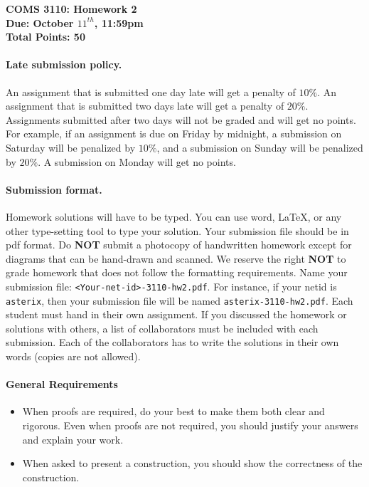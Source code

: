 \documentclass[12pt]{article}
\date{}
\begin{document}
\begin{center}
  \textbf{COMS 3110: Homework 2}\\
  \textbf{Due: October $11^{th}$, 11:59pm}\\
  \textbf{Total Points: 50}
\end{center}


\paragraph{Late submission policy.\ }
An assignment that is submitted one day late will get a penalty of $10\%$. An assignment that is submitted two days late will get a penalty of $20\%$. Assignments submitted after two days will not be graded and will get no points. For example, if an assignment is due on Friday by midnight, a submission on Saturday will be penalized by $10\%$, and a submission on Sunday will be penalized by $20\%$. A submission on Monday will get no points. 

\paragraph{Submission format.\ }
Homework solutions will have to be typed. You can use word, LaTeX, or any other type-setting tool to type your solution. Your submission file should be in pdf format. Do \textbf{NOT} submit a photocopy of handwritten homework except for diagrams that can be hand-drawn and scanned. We reserve the right \textbf{NOT} to grade homework that does not follow the formatting requirements.
Name your submission
file: \texttt{<Your-net-id>-3110-hw2.pdf}. For instance, if your netid
is \texttt{asterix}, then your submission file will be named
\texttt{asterix-3110-hw2.pdf}.
Each student must hand in their own assignment. If you discussed the homework or solutions with others, a list of collaborators must be included with each submission. Each of the collaborators has to write the solutions in their own words (copies are not allowed).

\paragraph{General Requirements}
\begin{itemize}
    \item When proofs are required, do your best to make them both clear and rigorous. Even when proofs are not required, you should justify your answers and explain your work.
    \item When asked to present a construction, you should show the correctness of the construction.
\end{itemize}
\end{document}

